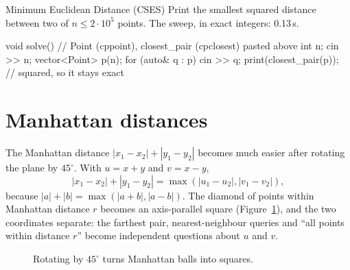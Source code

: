
\begin{problem}{Minimum Euclidean Distance (CSES)}
Print the smallest squared distance between two of $n \le 2 \cdot 10^5$ points.
\solution The sweep, in exact integers: 0.13\,s.
\end{problem}

\begin{code}
void solve() {  // Point (cppoint), closest_pair (cpclosest) pasted above
    int n;
    cin >> n;
    vector<Point> p(n);
    for (auto& q : p) cin >> q;
    print(closest_pair(p));  // squared, so it stays exact
}
\end{code}

\section[Manhattan distances]{Manhattan distances \hfill \gold}\label{sec:manhattan}

The Manhattan distance $|x_1 - x_2| + |y_1 - y_2|$ becomes much easier after rotating the plane by $45^\circ$. With $u = x + y$ and $v
= x - y$,
\[
  |x_1 - x_2| + |y_1 - y_2| = \max(|u_1 - u_2|, |v_1 - v_2|),
\]
because $|a| + |b| = \max(|a + b|, |a - b|)$. The diamond of points within Manhattan distance $r$ becomes an axis-parallel square
(Figure~\ref{fig:manhattan}), and the two coordinates separate: the farthest pair, nearest-neighbour queries and ``all points within
distance $r$'' become independent questions about $u$ and $v$.

\begin{figure}[htbp]
\centering
{}
\caption{Rotating by $45^\circ$ turns Manhattan balls into squares.}
\label{fig:manhattan}
\end{figure}

